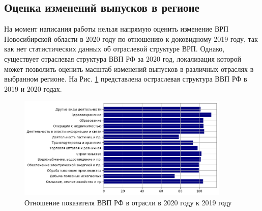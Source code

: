 \documentclass[12pt, a4paper]{article}
\begin{document}
\subsection{Оценка изменений выпусков в регионе}
На момент написания работы нельзя напрямую оценить изменение ВРП Новосибирской области в 2020 году по отношению к доковидному 2019 году, так как нет статистических данных об отраслевой структуре ВРП. Однако, существует отраслевая структура ВВП РФ за 2020 год, локализация которой может позволить оценить масштаб изменений выпусков в различных отраслях в выбранном регионе. На Рис. \ref{vvp_rf} представлена остраслевая структура ВВП РФ в 2019 и 2020 годах.

\begin{figure}[h]
\includegraphics[width=0.9\textwidth]{pictures/vvp_rf.png}
\caption{Отношение показателя ВВП РФ в отрасли в 2020 году к 2019 году}
\label{vvp_rf}
\end{figure}
\end{document}

